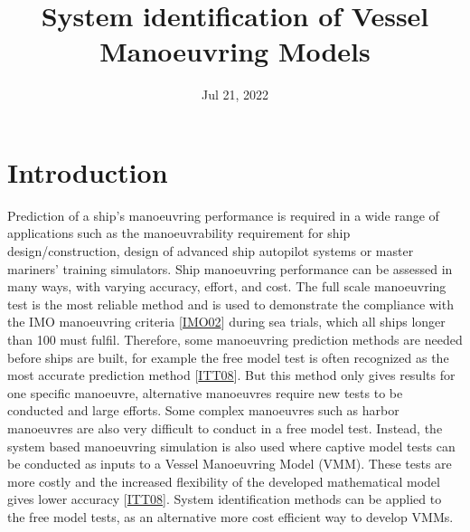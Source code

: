 \documentclass[review]{elsarticle}
\title{System identification of Vessel Manoeuvring Models}
\date{Jul 21, 2022}
\begin{document}



\pagestyle{empty}

\pagestyle{plain}

\pagestyle{normal}
\label{\detokenize{index::doc}}



\section{Introduction}
\label{\detokenize{00.02_introduction:introduction}}\label{\detokenize{00.02_introduction::doc}}
\sphinxAtStartPar
Prediction of a ship’s manoeuvring performance is required in a wide range of applications such as the manoeuvrability requirement for ship design/construction, design of advanced ship autopilot systems or master mariners’ training simulators. Ship manoeuvring performance can be assessed in many ways, with varying accuracy, effort, and cost. The full scale manoeuvring test is the most reliable method and is used to demonstrate the compliance with the IMO manoeuvring criteria {[}\hyperlink{cite.bibligraphy:id16}{IMO02}{]} during sea trials, which all ships longer than 100 must fulfil. Therefore, some manoeuvring prediction methods are needed before ships are built, for example the free model test is often recognized as the most accurate prediction method {[}\hyperlink{cite.bibligraphy:id75}{ITT08}{]}. 
But this method only gives results for one specific manoeuvre, alternative manoeuvres require new tests to be conducted and large efforts. Some complex manoeuvres such as harbor manoeuvres are also very difficult to conduct in a free model test.
Instead, the system based manoeuvring simulation is also used where captive model tests can be conducted as inputs to a Vessel Manoeuvring Model (VMM). These tests are more costly and the increased flexibility of the developed mathematical model gives lower accuracy {[}\hyperlink{cite.bibligraphy:id75}{ITT08}{]}. System identification methods can be applied to the free model tests, as an alternative more cost efficient way to develop VMMs.
\end{document}
